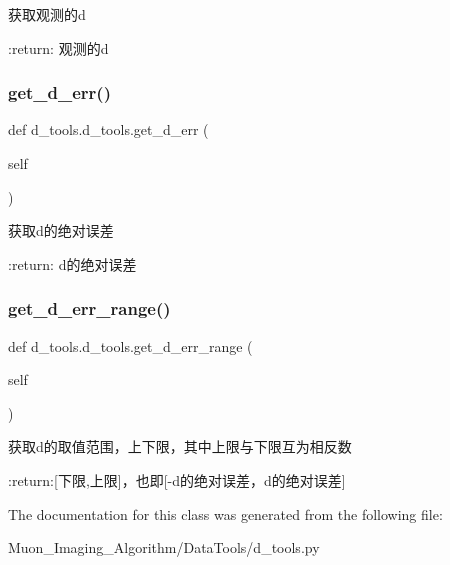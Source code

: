 \begin{DoxyVerb}获取观测的d

:return: 观测的d
\end{DoxyVerb}
 \mbox{\label{classd__tools_1_1d__tools_a5dcd3de99d3f89d30ef89524f05893f0}} 
\subsubsection{\texorpdfstring{get\+\_\+d\+\_\+err()}{get\_d\_err()}}
{\footnotesize\ttfamily def d\+\_\+tools.\+d\+\_\+tools.\+get\+\_\+d\+\_\+err (\begin{DoxyParamCaption}\item[{}]{self }\end{DoxyParamCaption})}

\begin{DoxyVerb}获取d的绝对误差

:return: d的绝对误差
\end{DoxyVerb}
 \mbox{\label{classd__tools_1_1d__tools_a83ab510f3abfa1ca21697cbea59b4272}} 
\subsubsection{\texorpdfstring{get\+\_\+d\+\_\+err\+\_\+range()}{get\_d\_err\_range()}}
{\footnotesize\ttfamily def d\+\_\+tools.\+d\+\_\+tools.\+get\+\_\+d\+\_\+err\+\_\+range (\begin{DoxyParamCaption}\item[{}]{self }\end{DoxyParamCaption})}

\begin{DoxyVerb}获取d的取值范围，上下限，其中上限与下限互为相反数

:return:[下限,上限]，也即[-d的绝对误差，d的绝对误差]
\end{DoxyVerb}
 

The documentation for this class was generated from the following file\+:\begin{DoxyCompactItemize}
\item 
Muon\+\_\+\+Imaging\+\_\+\+Algorithm/\+Data\+Tools/d\+\_\+tools.\+py\end{DoxyCompactItemize}
